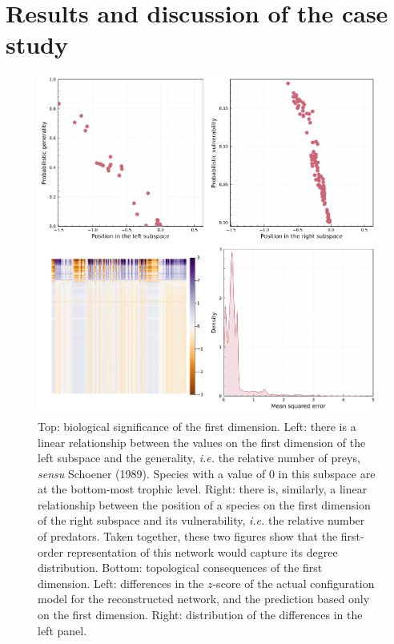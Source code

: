 \documentclass[10pt,oneside]{article}
\makeatletter
\def\maxwidth{\ifdim\Gin@nat@width>\linewidth\linewidth
\else\Gin@nat@width\fi}
\let\Oldincludegraphics\includegraphics
\renewcommand{\includegraphics}[1]{\Oldincludegraphics[width=\maxwidth]{#1}}
\makeatother
\begin{document}
\hypertarget{results-and-discussion-of-the-case-study}{%
\section{Results and discussion of the case
study}\label{results-and-discussion-of-the-case-study}}

\begin{figure}
\hypertarget{fig:degree}{%
\centering
\includegraphics{figures/figure-degree.png}
\caption{Top: biological significance of the first dimension. Left:
there is a linear relationship between the values on the first dimension
of the left subspace and the generality, \emph{i.e.} the relative number
of preys, \emph{sensu} Schoener (1989). Species with a value of 0 in
this subspace are at the bottom-most trophic level. Right: there is,
similarly, a linear relationship between the position of a species on
the first dimension of the right subspace and its vulnerability,
\emph{i.e.} the relative number of predators. Taken together, these two
figures show that the first-order representation of this network would
capture its degree distribution. Bottom: topological consequences of the
first dimension. Left: differences in the \(z\)-score of the actual
configuration model for the reconstructed network, and the prediction
based only on the first dimension. Right: distribution of the
differences in the left panel.}\label{fig:degree}
}
\end{figure}
\end{document}
